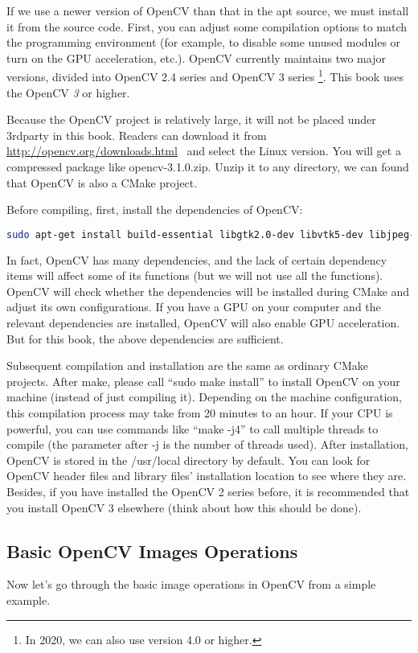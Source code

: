 If we use a newer version of OpenCV than that in the apt source, we must install it from the source code. First, you can adjust some compilation options to match the programming environment (for example, to disable some unused modules or turn on the GPU acceleration, etc.). OpenCV currently maintains two major versions, divided into OpenCV 2.4 series and OpenCV 3 series \footnote{In 2020, we can also use version 4.0 or higher.}. This book uses the OpenCV \textit {3} or higher.

Because the OpenCV project is relatively large, it will not be placed under 3rdparty in this book. Readers can download it from ~ \url{http://opencv.org/downloads.html}~ and select the Linux version. You will get a compressed package like opencv-3.1.0.zip. Unzip it to any directory, we can found that OpenCV is also a CMake project.

Before compiling, first, install the dependencies of OpenCV:
\begin{lstlisting}[language=sh, caption=Terminal input:]
sudo apt-get install build-essential libgtk2.0-dev libvtk5-dev libjpeg-dev libtiff4-dev libjasper-dev libopenexr-dev libtbb-dev
\end{lstlisting}

In fact, OpenCV has many dependencies, and the lack of certain dependency items will affect some of its functions (but we will not use all the functions). OpenCV will check whether the dependencies will be installed during CMake and adjust its own configurations. If you have a GPU on your computer and the relevant dependencies are installed, OpenCV will also enable GPU acceleration. But for this book, the above dependencies are sufficient.

Subsequent compilation and installation are the same as ordinary CMake projects. After make, please call ``sudo make install'' to install OpenCV on your machine (instead of just compiling it). Depending on the machine configuration, this compilation process may take from 20 minutes to an hour. If your CPU is powerful, you can use commands like ``make -j4'' to call multiple threads to compile (the parameter after -j is the number of threads used). After installation, OpenCV is stored in the /usr/local directory by default. You can look for OpenCV header files and library files' installation location to see where they are. Besides, if you have installed the OpenCV 2 series before, it is recommended that you install OpenCV 3 elsewhere (think about how this should be done).

\subsection{Basic OpenCV Images Operations}
Now let's go through the basic image operations in OpenCV from a simple example.

